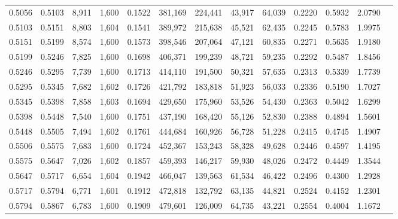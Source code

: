 \begin{tabular}{rrrrrrrrrrrrr}
0.5056 & 0.5103 &  8,911 & 1,600 &                                     0.1522 & 381,169 & 224,441 &  43,917 &  64,039 & 0.2220 & 0.5932 & 2.0790 \\
0.5103 & 0.5151 &  8,803 & 1,604 &                                     0.1541 & 389,972 & 215,638 &  45,521 &  62,435 & 0.2245 & 0.5783 & 1.9975 \\
0.5151 & 0.5199 &  8,574 & 1,600 &                                     0.1573 & 398,546 & 207,064 &  47,121 &  60,835 & 0.2271 & 0.5635 & 1.9180 \\
0.5199 & 0.5246 &  7,825 & 1,600 &                                     0.1698 & 406,371 & 199,239 &  48,721 &  59,235 & 0.2292 & 0.5487 & 1.8456 \\
0.5246 & 0.5295 &  7,739 & 1,600 &                                     0.1713 & 414,110 & 191,500 &  50,321 &  57,635 & 0.2313 & 0.5339 & 1.7739 \\
0.5295 & 0.5345 &  7,682 & 1,602 &                                     0.1726 & 421,792 & 183,818 &  51,923 &  56,033 & 0.2336 & 0.5190 & 1.7027 \\
0.5345 & 0.5398 &  7,858 & 1,603 &                                     0.1694 & 429,650 & 175,960 &  53,526 &  54,430 & 0.2363 & 0.5042 & 1.6299 \\
0.5398 & 0.5448 &  7,540 & 1,600 &                                     0.1751 & 437,190 & 168,420 &  55,126 &  52,830 & 0.2388 & 0.4894 & 1.5601 \\
0.5448 & 0.5505 &  7,494 & 1,602 &                                     0.1761 & 444,684 & 160,926 &  56,728 &  51,228 & 0.2415 & 0.4745 & 1.4907 \\
0.5506 & 0.5575 &  7,683 & 1,600 &                                     0.1724 & 452,367 & 153,243 &  58,328 &  49,628 & 0.2446 & 0.4597 & 1.4195 \\
0.5575 & 0.5647 &  7,026 & 1,602 &                                     0.1857 & 459,393 & 146,217 &  59,930 &  48,026 & 0.2472 & 0.4449 & 1.3544 \\
0.5647 & 0.5717 &  6,654 & 1,604 &                                     0.1942 & 466,047 & 139,563 &  61,534 &  46,422 & 0.2496 & 0.4300 & 1.2928 \\
0.5717 & 0.5794 &  6,771 & 1,601 &                                     0.1912 & 472,818 & 132,792 &  63,135 &  44,821 & 0.2524 & 0.4152 & 1.2301 \\
0.5794 & 0.5867 &  6,783 & 1,600 &                                     0.1909 & 479,601 & 126,009 &  64,735 &  43,221 & 0.2554 & 0.4004 & 1.1672 \\

\end{tabular}
